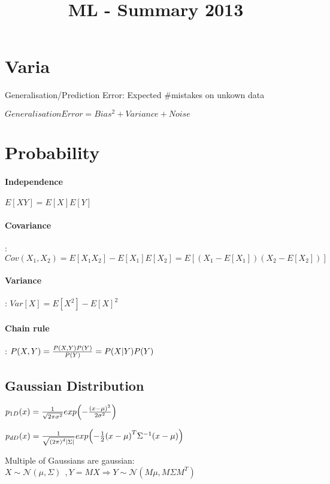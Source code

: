 \documentclass[11pt,twocolumn]{article}
\begin{document}
\title{ML - Summary 2013}



\section{Varia}

Generalisation/Prediction Error: Expected \#mistakes on unkown data


$Generalisation Error = Bias^2 + Variance + Noise$	

\section{Probability}

\paragraph{Independence} $E[XY] = E[X] E[Y]$

\paragraph{Covariance}: $Cov(X_1, X_2) = E[X_1 X_2] - E[X_1] E[X_2] = E[(X_1 - E[X_1])(X_2-E[X_2])]$

\paragraph{Variance}: $Var[X] = E[X^2] - E[X]^2$


\paragraph{Chain rule}: $P(X,Y) = {{P(X,Y)P(Y)}\over{P(Y)}} = P(X|Y)P(Y)$



\subsection{Gaussian Distribution}

$p_{1D}(x) = {1 \over {\sqrt{2 \pi \sigma^2}}} exp{\left( -{{\left(x - \mu\right)^2} \over{2 \sigma^2}} \right)}$


$p_{dD}(x) = {1 \over {\sqrt{{(2 \pi)}^d |\Sigma|}}} exp{\left( -{ {1 \over 2}  {\left(x - \mu\right)^T} \Sigma^{-1} {\left(x - \mu\right)}}\right)}$


Multiple of Gaussians are gaussian:
$X \sim  \mathcal{N}(\mu, \Sigma)~~, Y = MX \Rightarrow Y \sim \mathcal{N}(M\mu, M \Sigma M^T)$
\end{document}
